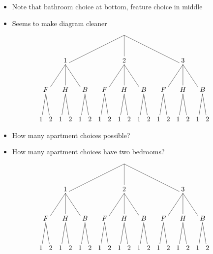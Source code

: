 \documentclass{beamer}
\theoremstyle{definition}
\begin{document}
\begin{frame}
\begin{itemize}
\item Note that bathroom choice at bottom, feature choice in middle
\item Seems to make diagram cleaner
\end{itemize}
\[\begin{xy}<.5cm,0cm>:
(8.5,0)="0";
(2.5,-3)="1";
(8.5,-3)="2";
(14.5,-3)="3";
"0";"1"*+!D{1}**\dir{-};
"0";"2"*+!D{2}**\dir{-};
"0";"3"*+!D{3}**\dir{-};
(.5,-6)="11";
(2.5,-6)="12";
(4.5,-6)="13";
(6.5,-6)="21";
(8.5,-6)="22";
(10.5,-6)="23";
(12.5,-6)="31";
(14.5,-6)="32";
(16.5,-6)="33";
"1";"11"*+!D{F}**\dir{-};
"1";"12"*+!D{H}**\dir{-};
"1";"13"*+!D{B}**\dir{-};
"2";"21"*+!D{F}**\dir{-};
"2";"22"*+!D{H}**\dir{-};
"2";"23"*+!D{B}**\dir{-};
"3";"31"*+!D{F}**\dir{-};
"3";"32"*+!D{H}**\dir{-};
"3";"33"*+!D{B}**\dir{-};
"11";(0,-9)*+!D{1}**\dir{-};
"11";(1,-9)*+!D{2}**\dir{-};
"12";(2,-9)*+!D{1}**\dir{-};
"12";(3,-9)*+!D{2}**\dir{-};
"13";(4,-9)*+!D{1}**\dir{-};
"13";(5,-9)*+!D{2}**\dir{-};
"21";(6,-9)*+!D{1}**\dir{-};
"21";(7,-9)*+!D{2}**\dir{-};
"22";(8,-9)*+!D{1}**\dir{-};
"22";(9,-9)*+!D{2}**\dir{-};
"23";(10,-9)*+!D{1}**\dir{-};
"23";(11,-9)*+!D{2}**\dir{-};
"31";(12,-9)*+!D{1}**\dir{-};
"31";(13,-9)*+!D{2}**\dir{-};
"32";(14,-9)*+!D{1}**\dir{-};
"32";(15,-9)*+!D{2}**\dir{-};
"33";(16,-9)*+!D{1}**\dir{-};
"33";(17,-9)*+!D{2}**\dir{-};
\end{xy}\]
\end{frame}

\begin{frame}
\begin{itemize}
\item How many apartment choices possible?
\item How many apartment choices have two bedrooms?
\end{itemize}
\[\begin{xy}<.5cm,0cm>:
(8.5,0)="0";
(2.5,-3)="1";
(8.5,-3)="2";
(14.5,-3)="3";
"0";"1"*+!D{1}**\dir{-};
"0";"2"*+!D{2}**\dir{-};
"0";"3"*+!D{3}**\dir{-};
(.5,-6)="11";
(2.5,-6)="12";
(4.5,-6)="13";
(6.5,-6)="21";
(8.5,-6)="22";
(10.5,-6)="23";
(12.5,-6)="31";
(14.5,-6)="32";
(16.5,-6)="33";
"1";"11"*+!D{F}**\dir{-};
"1";"12"*+!D{H}**\dir{-};
"1";"13"*+!D{B}**\dir{-};
"2";"21"*+!D{F}**\dir{-};
"2";"22"*+!D{H}**\dir{-};
"2";"23"*+!D{B}**\dir{-};
"3";"31"*+!D{F}**\dir{-};
"3";"32"*+!D{H}**\dir{-};
"3";"33"*+!D{B}**\dir{-};
"11";(0,-9)*+!D{1}**\dir{-};
"11";(1,-9)*+!D{2}**\dir{-};
"12";(2,-9)*+!D{1}**\dir{-};
"12";(3,-9)*+!D{2}**\dir{-};
"13";(4,-9)*+!D{1}**\dir{-};
"13";(5,-9)*+!D{2}**\dir{-};
"21";(6,-9)*+!D{1}**\dir{-};
"21";(7,-9)*+!D{2}**\dir{-};
"22";(8,-9)*+!D{1}**\dir{-};
"22";(9,-9)*+!D{2}**\dir{-};
"23";(10,-9)*+!D{1}**\dir{-};
"23";(11,-9)*+!D{2}**\dir{-};
"31";(12,-9)*+!D{1}**\dir{-};
"31";(13,-9)*+!D{2}**\dir{-};
"32";(14,-9)*+!D{1}**\dir{-};
"32";(15,-9)*+!D{2}**\dir{-};
"33";(16,-9)*+!D{1}**\dir{-};
"33";(17,-9)*+!D{2}**\dir{-};
\end{xy}\]
\end{frame}
\end{document}
